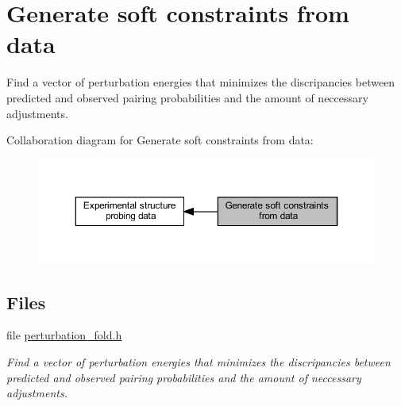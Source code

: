 \hypertarget{group__perturbation}{}\section{Generate soft constraints from data}
\label{group__perturbation}


Find a vector of perturbation energies that minimizes the discripancies between predicted and observed pairing probabilities and the amount of neccessary adjustments.  


Collaboration diagram for Generate soft constraints from data\+:
\nopagebreak
\begin{figure}[H]
\begin{center}
\leavevmode
\includegraphics[width=350pt]{group__perturbation}
\end{center}
\end{figure}
\subsection*{Files}
\begin{DoxyCompactItemize}
\item 
file \hyperlink{perturbation__fold_8h}{perturbation\+\_\+fold.\+h}
\begin{DoxyCompactList}\small\item\em Find a vector of perturbation energies that minimizes the discripancies between predicted and observed pairing probabilities and the amount of neccessary adjustments. \end{DoxyCompactList}\end{DoxyCompactItemize}
